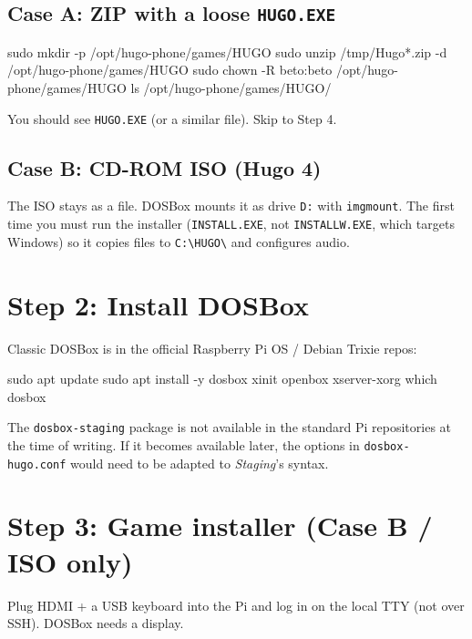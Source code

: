 \subsection{Case A: ZIP with a loose \texttt{HUGO.EXE}}

\begin{shellcode}
sudo mkdir -p /opt/hugo-phone/games/HUGO
sudo unzip /tmp/Hugo*.zip -d /opt/hugo-phone/games/HUGO
sudo chown -R beto:beto /opt/hugo-phone/games/HUGO
ls /opt/hugo-phone/games/HUGO/
\end{shellcode}

You should see \texttt{HUGO.EXE} (or a similar file). Skip to Step 4.

\subsection{Case B: CD-ROM ISO (Hugo 4)}

The ISO stays as a file. DOSBox mounts it as drive \texttt{D:} with \texttt{imgmount}. The first time you must run the installer (\texttt{INSTALL.EXE}, not \texttt{INSTALLW.EXE}, which targets Windows) so it copies files to \texttt{C:\textbackslash{}HUGO\textbackslash{}} and configures audio.

\section{Step 2: Install DOSBox}

Classic DOSBox is in the official Raspberry Pi OS / Debian Trixie repos:

\begin{shellcode}
sudo apt update
sudo apt install -y dosbox xinit openbox xserver-xorg
which dosbox
\end{shellcode}

\begin{note}
The \texttt{dosbox-staging} package is not available in the standard Pi repositories at the time of writing. If it becomes available later, the options in \texttt{dosbox-hugo.conf} would need to be adapted to \emph{Staging}'s syntax.
\end{note}

\section{Step 3: Game installer (Case B / ISO only)}

Plug HDMI + a USB keyboard into the Pi and log in on the local TTY (not over SSH). DOSBox needs a display.

